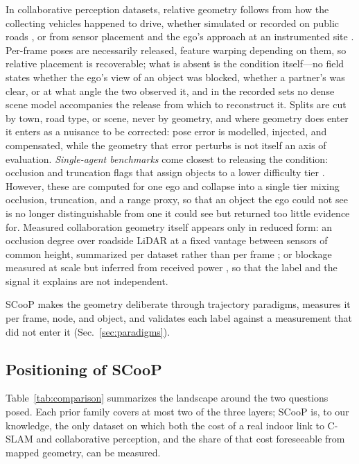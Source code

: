 \documentclass[journal]{IEEEtran}
\begin{document}
In collaborative perception datasets, relative geometry follows from
how the collecting vehicles happened to drive, whether simulated
\cite{opv2v} or recorded on public roads \cite{v2v4real}, or from
sensor placement and the ego's approach at an instrumented site
\cite{dairv2x}. Per-frame poses are necessarily released, feature
warping depending on them, so relative placement is recoverable; what
is absent is the condition itself---no field states whether the ego's
view of an object was blocked, whether a partner's was clear, or at
what angle the two observed it, and in the recorded sets no dense
scene model accompanies the release from which to reconstruct it.
Splits are cut by town, road type, or scene, never by geometry, and
where geometry does enter it enters as a nuisance to be corrected:
pose error is modelled, injected, and compensated, while the geometry
that error perturbs is not itself an axis of evaluation.
\emph{Single-agent benchmarks} come closest to releasing the
condition: occlusion and truncation flags that assign objects to a
lower difficulty tier \cite{kitti}. However, these are computed for
one ego and collapse into a single tier mixing occlusion, truncation,
and a range proxy, so that an object the ego could not see is no
longer distinguishable from one it could see but returned too little
evidence for. Measured collaboration geometry itself appears only in
reduced form: an occlusion degree over roadside LiDAR at a fixed
vantage between sensors of common height, summarized per dataset
rather than per frame \cite{inscope}; or blockage measured at scale
but inferred from received power \cite{deepsense6g}, so that the label
and the signal it explains are not independent.

SCooP makes the geometry deliberate through trajectory paradigms,
measures it per frame, node, and object, and validates each label
against a measurement that did not enter it
(Sec.~\ref{sec:paradigms}).

\subsection{Positioning of SCooP}
Table~\ref{tab:comparison} summarizes the landscape around the two
questions posed. Each prior family covers at most two of the three
layers; SCooP is, to our knowledge, the only dataset on which both the
cost of a real indoor link to C-SLAM and collaborative perception, and
the share of that cost foreseeable from mapped geometry, can be
measured.


\end{document}
